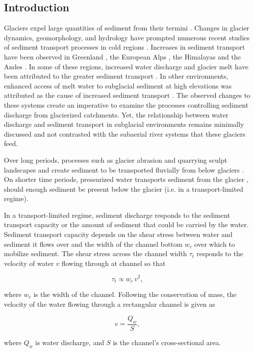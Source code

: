 \documentclass[11pt]{article}
\begin{document}
\begin{spacing}{1}
  \section{Introduction}

  Glaciers expel large quantities of sediment from their termini \citep{hallet1996}.
  Changes in glacier dynamics, geomorphology, and hydrology  have prompted numerous  recent studies of  sediment transport processes in cold regions \citep[e.g.][]{zhang2022}.
  Increases in sediment transport  have been observed in Greenland \citep{bendixen2017}, the European Alps \citep{costa2017}, the Himalayas \citep{li2021} and the Andes \citep{vergara2022}.
  In some of these regions, increased water discharge and glacier melt have been attributed to the greater sediment transport \citep{bendixen2017,costa2017,li2021}.
  In other environments, enhanced access of melt water to subglacial sediment at high elevations was attributed as the cause of increased sediment transport \citep{delaney2020,vergara2022}.
  The observed changes to these systems create an imperative to examine the processes controlling sediment discharge from glacierized catchments. 
  Yet, the relationship between water discharge and sediment transport in subglacial environments remains minimally discussed and not contrasted with the subaerial river systems that these glaciers feed.
 
  Over long periods, processes such as glacier abrasion and quarrying sculpt landscapes and create sediment to be transported fluvially from below glaciers \citep[c.f.][]{hallet1979,iverson2012,ugelvig2018}. 
  On shorter time periods, pressurized water transports sediment from the glacier \citep{walder1994,creyts2013,beaud2018}, should enough sediment be present below the glacier (i.e. in a transport-limited regime).
  
  In a transport-limited regime, sediment discharge responds to the sediment transport capacity or the amount of sediment that could be carried by the water. Sediment transport capacity depends on the shear stress between water and sediment it flows  over \citep{shields1936,meyer1948,engelund1967} and the width of the channel bottom $w_c$ over which to mobilize sediment. The shear stress  across the channel width $\tau_t$ responds to the velocity of water $v$ flowing through at channel so that 
  \begin{linenomath*}
    \begin{equation}
      \label{eq:tau_t}
      \tau_t \propto w_c\, v^2,
    \end{equation}
  \end{linenomath*}
  where $w_c$ is the width of the channel.
  Following the conservation of mass, the velocity of the water flowing through a rectangular channel is given as 
  \begin{linenomath*}
    \begin{equation}
      \label{eq:v}
      v = \frac{Q_w}{S},
    \end{equation}
  \end{linenomath*}
  where $Q_w$ is water discharge,  and $S$ is the channel's cross-sectional area.


\end{spacing}
\end{document}
